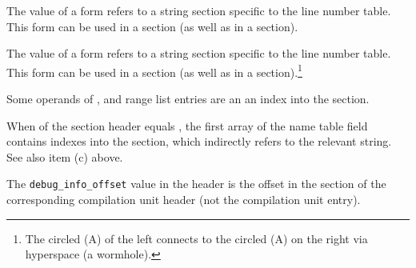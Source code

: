 \begin{description}
The value of a \DWFORMlinestrp{} form refers to a
string section specific to the line number table.
This form can be used in a \dotdebugline{} section
(as well as in a \dotdebuginfo{} section).

The value of a \DWFORMlinestrp{} form refers to a
string section specific to the line number table.
This form can be used in a \dotdebuginfo{} section
(as well as in a \dotdebugline{} section).\footnote{
\bb
The circled (A) of the left connects to the circled
(A) on the right 
\eb
via hyperspace (a wormhole).}
\bb

Some operands of \DWRLEbaseaddressx, \DWRLEstartxendx{} and 
\DWRLEstartxlength{} range list entries are an 
an index into the \dotdebugaddr{} section.
\eb

%
\bb
{}
When \HFNstrformat{} of the section header equals \DWFORMstrxfour{}, 
the first array of the name table
field contains indexes into the \dotdebugstroffsets{} section, 
which indirectly refers to the relevant string.
See also item (c) above.
\eb

\bb
%
The \texttt{debug\_info\_offset} value in
the header is
the offset in the \dotdebuginfo{} section of the
corresponding compilation unit header (not the compilation
unit entry).
\eb


\end{description}



